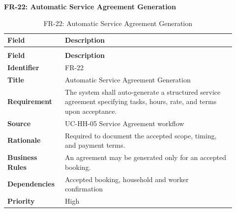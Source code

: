 \documentclass[12pt,a4paper]{article}
\begin{document}
\noindent\textbf{FR-22: Automatic Service Agreement Generation}\par
\vspace{4pt}
\begingroup\small\setlength{\tabcolsep}{4pt}\renewcommand{\arraystretch}{1.15}
\begin{longtable}{|>{\raggedright\arraybackslash}p{0.22\linewidth}|>{\raggedright\arraybackslash}p{0.70\linewidth}|}
\caption{FR-22: Automatic Service Agreement Generation}\label{tab:fr-22}\\
\hline
\textbf{Field} & \textbf{Description} \\ \hline
\endfirsthead
\multicolumn{2}{c}{Table \thetable\ Automatic Service Agreement Generation (continued)}\\
\hline
\textbf{Field} & \textbf{Description} \\ \hline
\endhead
\textbf{Identifier} & FR-22 \\ \hline
\textbf{Title} & Automatic Service Agreement Generation \\ \hline
\textbf{Requirement} & The system shall auto-generate a structured service agreement specifying tasks, hours, rate, and terms upon acceptance. \\ \hline
\textbf{Source} & UC-HH-05 Service Agreement workflow \\ \hline
\textbf{Rationale} & Required to document the accepted scope, timing, and payment terms. \\ \hline
\textbf{Business Rules} & An agreement may be generated only for an accepted booking. \\ \hline
\textbf{Dependencies} & Accepted booking, household and worker confirmation \\ \hline
\textbf{Priority} & High \\ \hline
\end{longtable}
\endgroup
\clearpage
\end{document}
